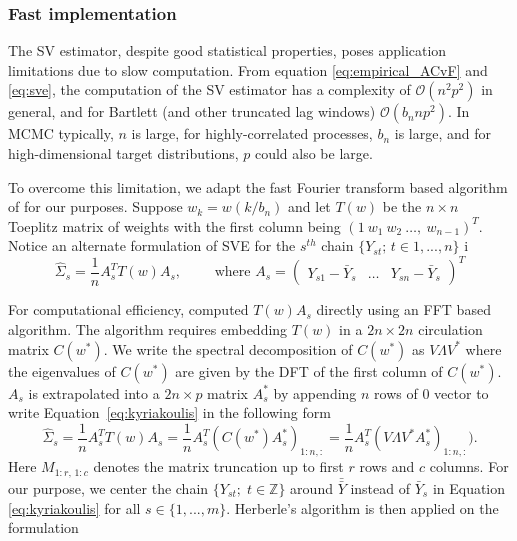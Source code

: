 \documentclass[11pt]{article}
\theoremstyle{remark}
\begin{document}
\subsubsection{Fast implementation} %
\label{ssub:fast_implementation}

The SV estimator, despite good statistical properties, poses application limitations due to slow computation. From equation \ref{eq:empirical_ACvF} and \ref{eq:sve}, the computation of the SV estimator has a complexity of $\mathcal{O}(n^2 p^2)$ in general, and for Bartlett (and other truncated lag windows) $\mathcal{O}(b_n n p^2)$. In MCMC typically, $n$ is large, for highly-correlated processes, $b
_n$ is large, and for high-dimensional target distributions, $p$ could also be large. 

To overcome this limitation, we adapt the  fast Fourier transform based algorithm of \cite{heberle2017fast} for our purposes. Suppose $w_k = w(k/b_n)$ and let $T(w)$ be the $n \times n$ Toeplitz matrix of weights with the first column being $(1 ~ w_1 ~ w_2 ~ \dots, ~ w_{n-1})^T$. Notice an alternate formulation of SVE for the $s^{th}$ chain $\{Y_{st};\, t \in 1, ..., n\}$ i
%
\begin{equation} \label{eq:kyriakoulis}
    \hat{\Sigma}_s = \dfrac{1}{n}A_s^T T(w) A_s, \qquad \textrm{ where } A_s = \begin{pmatrix}
    Y_{s1} - \bar{Y}_s  & \dots & Y_{sn} - \bar{Y}_s
\end{pmatrix}^T
\end{equation}


For computational efficiency, \cite{heberle2017fast} computed $T(w)A_s$ directly using an FFT based algorithm. The algorithm requires embedding $T(w)$ in a $2n \times 2n$ circulation matrix $C(w^*)$. We write the spectral decomposition of $C(w^*)$ as $V\Lambda V^*$ where the eigenvalues of $C(w^*)$ are given by the DFT of the first column of $C(w^*)$. $A_s$ is extrapolated into a $2n \times p$ matrix $A_s^*$ by appending $n$ rows of $0$ vector to write Equation~\ref{eq:kyriakoulis} in the following form
\[
    \hat{\Sigma}_s = \dfrac{1}{n} A_s^T T(w) A_s = \dfrac{1}{n} A_s^T (C(w^*) A_s^*)_{1:n, :} = \dfrac{1}{n} A_s^T (V \Lambda V^* A_s^*)_{1:n, :}).
\]
Here $M_{1:r, \, 1:c}$ denotes the matrix truncation up to first $r$ rows and $c$ columns. For our purpose, we center the chain $\{Y_{st}; \; t \in \mathbb{Z}\}$ around $\bar{\bar{Y}}$ instead of $\bar{Y}_s$ in Equation \ref{eq:kyriakoulis} for all $s \in \{1, ..., m\}$. Herberle's algorithm is then applied on the formulation
\end{document}
